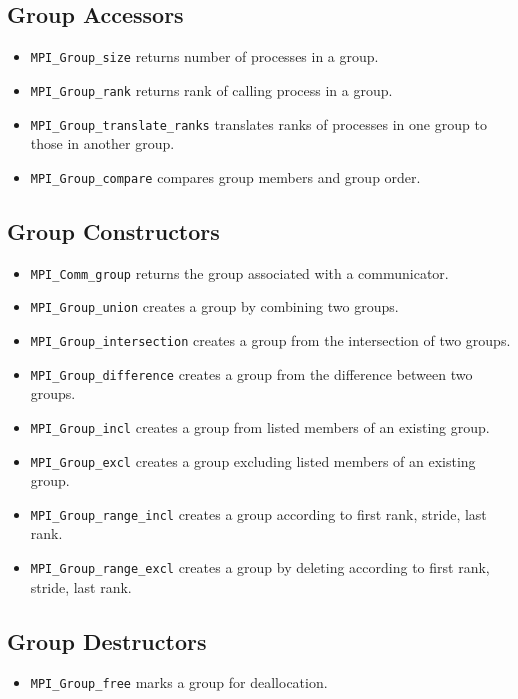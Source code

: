 \subsection{Group Accessors}
\begin{itemize}
\item\texttt{MPI\_Group\_size} returns number of processes in a group.
\item\texttt{MPI\_Group\_rank} returns rank of calling process in a group.
\item\texttt{MPI\_Group\_translate\_ranks} translates ranks of processes in one group to those in another group.
\item\texttt{MPI\_Group\_compare} compares group members and group order.
\end{itemize}

\subsection{Group Constructors}
\begin{itemize}
\item\texttt{MPI\_Comm\_group} returns the group associated with a communicator.
\item\texttt{MPI\_Group\_union} creates a group by combining two groups.
\item\texttt{MPI\_Group\_intersection} creates a group from the intersection of two groups.
\item\texttt{MPI\_Group\_difference} creates a group from the difference between two groups.
\item\texttt{MPI\_Group\_incl} creates a group from listed members of an existing group.
\item\texttt{MPI\_Group\_excl} creates a group excluding listed members of an existing group.
\item\texttt{MPI\_Group\_range\_incl} creates a group according to first rank, stride, last rank.
\item\texttt{MPI\_Group\_range\_excl} creates a group by deleting according to first rank, stride, last rank.
\end{itemize}

\subsection{Group Destructors}
\begin{itemize}
\item\texttt{MPI\_Group\_free} marks a group for deallocation.
\end{itemize}

